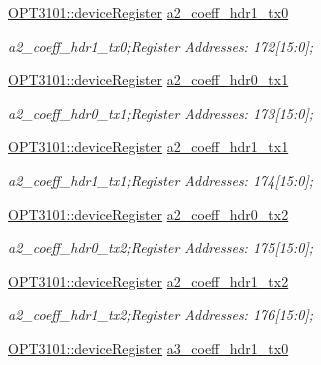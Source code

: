 \begin{DoxyCompactItemize}
\mbox{\hyperlink{class_o_p_t3101_1_1device_register}{O\+P\+T3101\+::device\+Register}} \mbox{\hyperlink{class_o_p_t3101_1_1registers_a0e7b936dff92577b0167b0d3e8a42827}{a2\+\_\+coeff\+\_\+hdr1\+\_\+tx0}}
\begin{DoxyCompactList}\small\item\em a2\+\_\+coeff\+\_\+hdr1\+\_\+tx0;Register Addresses\+: 172\mbox{[}15\+:0\mbox{]}; \end{DoxyCompactList}\item 
\mbox{\hyperlink{class_o_p_t3101_1_1device_register}{O\+P\+T3101\+::device\+Register}} \mbox{\hyperlink{class_o_p_t3101_1_1registers_a7e97aec69ecbe00c5b35ef15d3abca3c}{a2\+\_\+coeff\+\_\+hdr0\+\_\+tx1}}
\begin{DoxyCompactList}\small\item\em a2\+\_\+coeff\+\_\+hdr0\+\_\+tx1;Register Addresses\+: 173\mbox{[}15\+:0\mbox{]}; \end{DoxyCompactList}\item 
\mbox{\hyperlink{class_o_p_t3101_1_1device_register}{O\+P\+T3101\+::device\+Register}} \mbox{\hyperlink{class_o_p_t3101_1_1registers_af692ae28d704077d2340a8002606256d}{a2\+\_\+coeff\+\_\+hdr1\+\_\+tx1}}
\begin{DoxyCompactList}\small\item\em a2\+\_\+coeff\+\_\+hdr1\+\_\+tx1;Register Addresses\+: 174\mbox{[}15\+:0\mbox{]}; \end{DoxyCompactList}\item 
\mbox{\hyperlink{class_o_p_t3101_1_1device_register}{O\+P\+T3101\+::device\+Register}} \mbox{\hyperlink{class_o_p_t3101_1_1registers_a51cd64111761c38c6cf6d842077bd8b0}{a2\+\_\+coeff\+\_\+hdr0\+\_\+tx2}}
\begin{DoxyCompactList}\small\item\em a2\+\_\+coeff\+\_\+hdr0\+\_\+tx2;Register Addresses\+: 175\mbox{[}15\+:0\mbox{]}; \end{DoxyCompactList}\item 
\mbox{\hyperlink{class_o_p_t3101_1_1device_register}{O\+P\+T3101\+::device\+Register}} \mbox{\hyperlink{class_o_p_t3101_1_1registers_a344c7afc60d213572a4fa428e4f1566d}{a2\+\_\+coeff\+\_\+hdr1\+\_\+tx2}}
\begin{DoxyCompactList}\small\item\em a2\+\_\+coeff\+\_\+hdr1\+\_\+tx2;Register Addresses\+: 176\mbox{[}15\+:0\mbox{]}; \end{DoxyCompactList}\item 
\mbox{\hyperlink{class_o_p_t3101_1_1device_register}{O\+P\+T3101\+::device\+Register}} \mbox{\hyperlink{class_o_p_t3101_1_1registers_a4d71ddf517bc042fc30fd79e1bbdfb4b}{a3\+\_\+coeff\+\_\+hdr1\+\_\+tx0}}

\end{DoxyCompactItemize}
